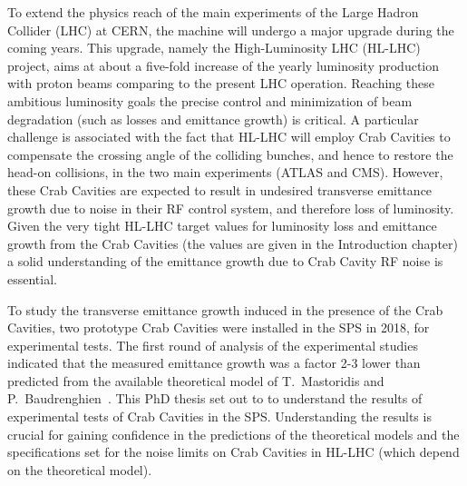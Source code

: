 To extend the physics reach of the main experiments of the Large Hadron Collider (LHC) at CERN, the machine will undergo a major upgrade during the coming years. This upgrade, namely the High-Luminosity LHC (HL-LHC) project, aims at about a five-fold increase of the yearly luminosity production with proton beams comparing to the present LHC operation. Reaching these ambitious luminosity goals the precise control and minimization of beam degradation (such as losses and emittance growth) is critical. A particular challenge is associated with the fact that HL-LHC will employ Crab Cavities to compensate the crossing angle of the colliding bunches, and hence to restore the head-on collisions, in the two main experiments (ATLAS and CMS). However, these Crab Cavities are expected to result in undesired transverse emittance growth due to noise in their RF control system, and therefore loss of luminosity. %
Given the very tight HL-LHC target values for luminosity loss and emittance growth from the Crab Cavities (the values are given in the Introduction chapter)
a solid understanding of the emittance growth due to Crab Cavity RF noise is essential. 

To study the transverse emittance growth induced in the presence of the Crab Cavities, two prototype Crab Cavities were installed in the SPS in 2018, for experimental tests. The first round of analysis of the experimental studies indicated that the measured emittance growth was a factor 2-3 lower than predicted from the available theoretical model of T.~Mastoridis and P.~Baudrenghien~\cite{PhysRevSTAB.18.101001}. This PhD thesis set out to to understand the results of experimental tests of Crab Cavities in the SPS. Understanding the results is crucial for gaining confidence in the predictions of the theoretical models and the specifications set for the noise limits on Crab Cavities in HL-LHC (which depend on the theoretical model).

